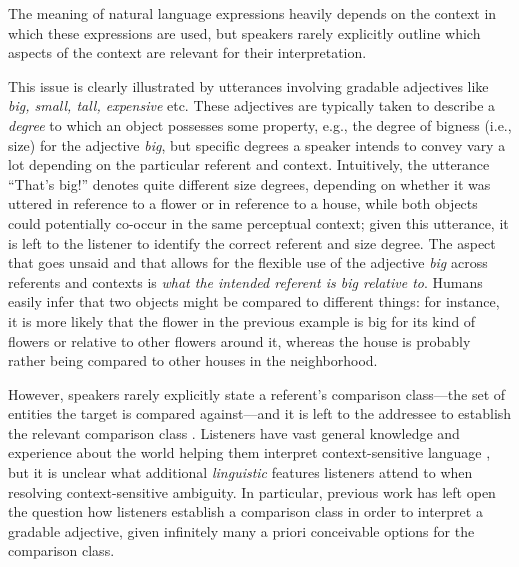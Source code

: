 The meaning of natural language expressions heavily depends on the context in which these expressions are used, but speakers rarely explicitly outline which aspects of the context are relevant for their interpretation. 

This issue is clearly illustrated by utterances involving gradable adjectives like \textit{big, small, tall, expensive} etc. These adjectives are typically taken to describe a \emph{degree} to which an object possesses some property, e.g., the degree of bigness (i.e., size) for the adjective \emph{big}, but specific degrees a speaker intends to convey vary a lot depending on the particular referent and context. Intuitively, the utterance “That’s big!” denotes quite different size degrees, depending on whether it was uttered in reference to a flower or in reference to a house, while both objects could potentially co-occur in the same perceptual context; given this utterance, it is left to the listener to identify the correct referent and size degree. The aspect that goes unsaid and that allows for the flexible use of the adjective \textit{big} across referents and contexts is \textit{what the intended referent is big relative to}. Humans easily infer that two objects might be compared to different things: for instance, it is more likely that the flower in the previous example is big for its kind of flowers or relative to other flowers around it, whereas the house is probably rather being compared to other houses in the neighborhood. 

However, speakers rarely explicitly state a referent's comparison class---the set of entities the target is compared against---and it is left to the addressee to establish the relevant comparison class \parencite{Solt2009}. Listeners have vast general knowledge and experience about the world helping them interpret context-sensitive language \parencite{tessler2017warm}, but it is unclear what additional \emph{linguistic} features listeners attend to when resolving context-sensitive ambiguity. 
In particular, previous work has left open the question how listeners establish a comparison class in order to interpret a gradable adjective, given infinitely many a priori conceivable options for the comparison class.

